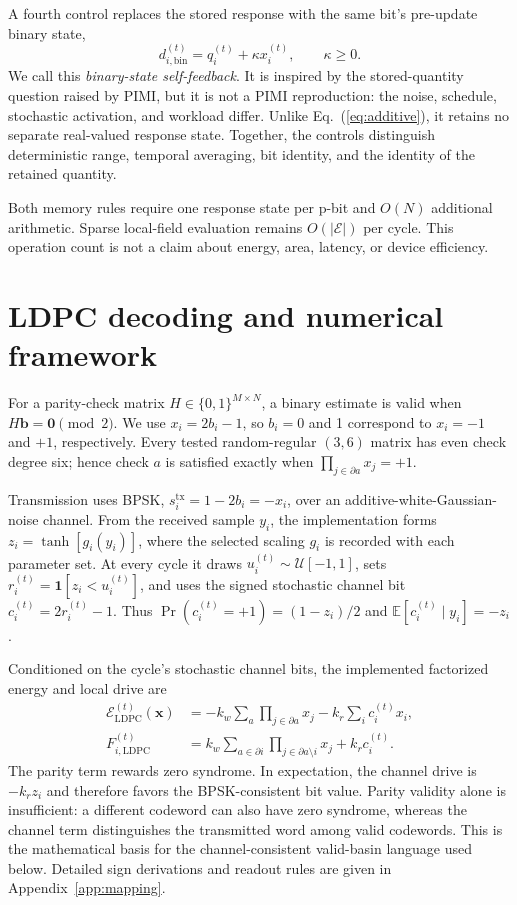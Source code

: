 \documentclass[aps,prapplied,reprint,superscriptaddress,longbibliography,floatfix]{revtex4-2}
\newcommand{\E}{\mathbb{E}}
\begin{document}
A fourth control replaces the stored response with the same bit's pre-update binary state,
\[
d_{i,\mathrm{bin}}^{(t)}=q_i^{(t)}+\kappa x_i^{(t)},\qquad \kappa\geq0.
\]
We call this \emph{binary-state self-feedback}.  It is inspired by the stored-quantity question raised by PIMI, but it is not a PIMI reproduction: the noise, schedule, stochastic activation, and workload differ.  Unlike Eq.~(\ref{eq:additive}), it retains no separate real-valued response state.  Together, the controls distinguish deterministic range, temporal averaging, bit identity, and the identity of the retained quantity.

Both memory rules require one response state per p-bit and $O(N)$ additional arithmetic.  Sparse local-field evaluation remains $O(|\mathcal{E}|)$ per cycle.  This operation count is not a claim about energy, area, latency, or device efficiency.

\section{LDPC decoding and numerical framework}
\label{sec:framework}

For a parity-check matrix $H\in\{0,1\}^{M\times N}$, a binary estimate is valid when $H\bm b=\bm 0\pmod 2$.  We use $x_i=2b_i-1$, so $b_i=0$ and 1 correspond to $x_i=-1$ and $+1$, respectively.  Every tested random-regular $(3,6)$ matrix has even check degree six; hence check $a$ is satisfied exactly when $\prod_{j\in\partial a}x_j=+1$.

Transmission uses BPSK, $s_i^{\mathrm{tx}}=1-2b_i=-x_i$, over an additive-white-Gaussian-noise channel.  From the received sample $y_i$, the implementation forms $z_i=\tanh[g_i(y_i)]$, where the selected scaling $g_i$ is recorded with each parameter set.  At every cycle it draws $u_i^{(t)}\sim\mathcal U[-1,1]$, sets $r_i^{(t)}=\mathbf 1[z_i<u_i^{(t)}]$, and uses the signed stochastic channel bit $c_i^{(t)}=2r_i^{(t)}-1$.  Thus $\Pr(c_i^{(t)}=+1)=(1-z_i)/2$ and $\E[c_i^{(t)}\mid y_i]=-z_i$.

Conditioned on the cycle's stochastic channel bits, the implemented factorized energy and local drive are
\begin{align}
\mathcal E_{\mathrm{LDPC}}^{(t)}(\bm x)
&=-k_w\sum_a\prod_{j\in\partial a}x_j
-k_r\sum_i c_i^{(t)}x_i, \label{eq:ldpcenergy}\\
F_{i,\mathrm{LDPC}}^{(t)}
&=k_w\sum_{a\in\partial i}\prod_{j\in\partial a\setminus i}x_j
+k_r c_i^{(t)} .
\label{eq:ldpcfield}
\end{align}
The parity term rewards zero syndrome.  In expectation, the channel drive is $-k_r z_i$ and therefore favors the BPSK-consistent bit value.  Parity validity alone is insufficient: a different codeword can also have zero syndrome, whereas the channel term distinguishes the transmitted word among valid codewords.  This is the mathematical basis for the channel-consistent valid-basin language used below.  Detailed sign derivations and readout rules are given in Appendix~\ref{app:mapping}.
\end{document}

